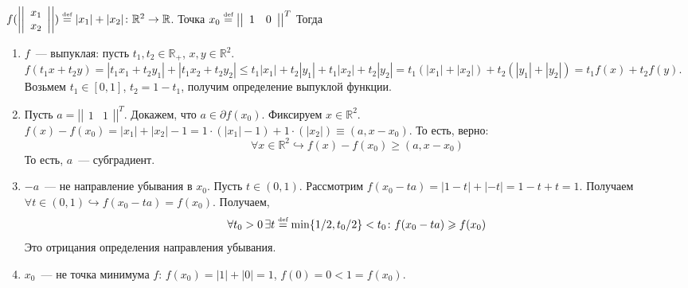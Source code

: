 \documentclass[a4paper]{article}
\newcommand{\matrixr}{\right|\right|}
\newcommand{\matrixl}{\left|\left|}
\def\eqdef{\overset{\mbox{\tiny def}}{=}}
\begin{document}
$f(\matrixl
\begin{array}{c}
x_1\\
x_2
\end{array}
\matrixr)\eqdef |x_1|+|x_2|\colon \mathbb{R}^2\to\mathbb{R}$. Точка $x_0\eqdef \matrixl
\begin{array}{cc}
1 & 0
\end{array}
\matrixr^T$ Тогда\begin{enumerate}
\item $f$~--- выпуклая: пусть $t_1,t_2\in\mathbb{R}_+$, $x,y\in\mathbb{R}^2$. $f(t_1x+t_2y)=|t_1x_1+t_2y_1|+|t_1x_2+t_2y_2|\leqslant t_1|x_1|+t_2|y_1|+t_1|x_2|+t_2|y_2|=t_1(|x_1|+|x_2|)+t_2(|y_1|+|y_2|)=t_1f(x)+t_2f(y)$. Возьмем $t_1\in[0,1]$, $t_2=1-t_1$, получим определение выпуклой функции.
\item Пусть $a=\matrixl
\begin{array}{cc}
1 & 1
\end{array}
\matrixr^T$. Докажем, что $a\in\partial f(x_0)$. Фиксируем $x\in\mathbb{R}^2$. $f(x)-f(x_0)=|x_1|+|x_2|-1=1\cdot(|x_1|-1)+1\cdot(|x_2|)\equiv(a, x-x_0)$. То есть, верно:
$$\forall x\in\mathbb{R}^2\hookrightarrow f(x)-f(x_0)\geqslant (a,x-x_0)$$
То есть, $a$~--- субградиент.
\item $-a$~--- не направление убывания в $x_0$. Пусть $t\in(0,1)$. Рассмотрим $f(x_0-ta)=|1-t|+|-t|=1-t+t=1$. Получаем $\forall t\in(0,1)\hookrightarrow f(x_0-ta)=f(x_0)$. Получаем, $$\forall t_0>0\,\exists t\eqdef\min\{1/2,t_0/2\}<t_0\colon f(x_0-ta)\geqslant f(x_0)$$
Это отрицания определения направления убывания.
\item $x_0$~--- не точка минимума $f$: $f(x_0)=|1|+|0|=1$, $f(0)=0<1=f(x_0)$.
\end{enumerate}
\end{document}
